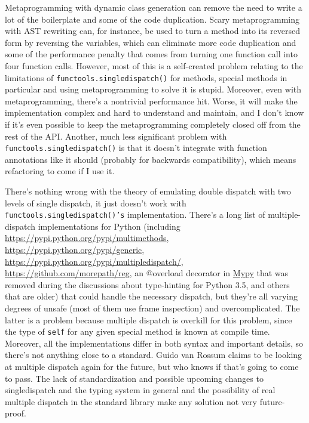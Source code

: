 \documentclass[12pt]{article}
\begin{document}
Metaprogramming with dynamic class generation can remove the need to
write a lot of the boilerplate and some of the code duplication.
Scary metaprogramming with AST rewriting can, for instance, be used to
turn a method into its reversed form by reversing the variables, which
can eliminate more code duplication and some of the performance
penalty that comes from turning one function call into four function
calls.  However, most of this is a self-created problem relating to
the limitations of \texttt{functools.singledispatch()} for methods,
special methods in particular and using metaprogramming to solve it is
stupid.  Moreover, even with metaprogramming, there's a nontrivial
performance hit.  Worse, it will make the implementation complex and
hard to understand and maintain, and I don't know if it's even
possible to keep the metaprogramming completely closed off from the
rest of the API.  Another, much less significant problem with
\texttt{functools.singledispatch()} is that it doesn't integrate with
function annotations like it should (probably for backwards
compatibility), which means refactoring to come if I use it.

There's nothing wrong with the theory of emulating double dispatch
with two levels of single dispatch, it just doesn't work with
\texttt{functools.singledispatch()'s} implementation.  There's a long
list of multiple-dispatch implementations for Python (including
\url{https://pypi.python.org/pypi/multimethods},
\url{https://pypi.python.org/pypi/generic},
\url{https://pypi.python.org/pypi/multipledispatch/},
\url{https://github.com/morepath/reg}, an @overload decorator in
\href{http://mypy-lang.org/}{Mypy} that was removed during the
discussions about type-hinting for Python 3.5, and others that are
older) that could handle the necessary dispatch, but they're all
varying degrees of unsafe (most of them use frame inspection) and
overcomplicated.  The latter is a problem because multiple dispatch is
overkill for this problem, since the type of \texttt{self} for any
given special method is known at compile time.  Moreover, all the
implementations differ in both syntax and important details, so
there's not anything close to a standard.  Guido van Rossum claims to
be looking at multiple dispatch again for the future, but who knows if
that's going to come to pass.  The lack of standardization and
possible upcoming changes to singledispatch and the typing system in
general and the possibility of real multiple dispatch in the standard
library make any solution not very future-proof.
\end{document}
